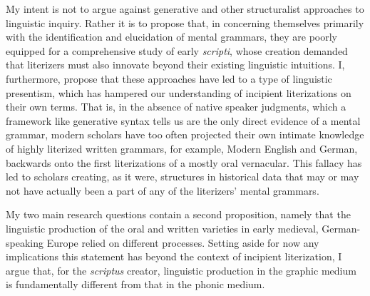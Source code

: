 \begin{sloppypar}
My intent is not to argue against generative and other structuralist approaches to linguistic inquiry. Rather it is to propose that, in concerning themselves primarily with the identification and elucidation of mental grammars, they are poorly equipped for a comprehensive study of early \textit{scripti}, whose creation demanded that literizers must also innovate beyond their existing linguistic intuitions. I, furthermore, propose that these approaches have led to a type of linguistic presentism, which has hampered our understanding of incipient literizations on their own terms. That is, in the absence of native speaker judgments, which a framework like generative syntax tells us are the only direct evidence of a mental grammar, modern scholars have too often projected their own intimate knowledge of highly literized written grammars, for example, Modern English and German, backwards onto the first literizations of a mostly oral vernacular. This fallacy has led to scholars creating, as it were, structures in historical data that may or may not have actually been a part of  any of the literizers’ mental grammars. 
\end{sloppypar}

My two main research questions contain a second proposition, namely that the linguistic production of the oral and written varieties in early medieval, German-speaking Europe relied on different processes. Setting aside for now any implications this statement has beyond the context of incipient literization, I argue that, for the \textit{scriptus} creator, linguistic production in the graphic medium is fundamentally different from that in the phonic medium. 

